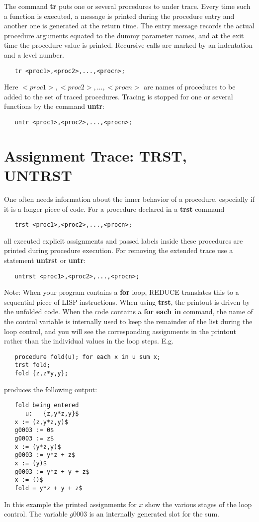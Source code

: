 The command {\bf tr} puts one or several procedures to
under trace. Every time such a function is executed, a message
is printed during the procedure entry and another one is generated
at the return time. The entry message records the 
actual procedure arguments equated to the dummy parameter
names, and at the exit time the procedure value is printed.
Recursive calls are marked by an indentation and a level number.

\begin{verbatim}
   tr <proc1>,<proc2>,...,<procn>;
\end{verbatim}
Here $<proc1>,<proc2>, \ldots ,<procn>$ are names of procedures
to be added to the set of traced procedures. Tracing is
stopped for one or several functions by the
command {\bf untr}:
\begin{verbatim}
   untr <proc1>,<proc2>,...,<procn>;
\end{verbatim}

\section{Assignment Trace: TRST, UNTRST}

One often needs information about the inner behavior of
a procedure, especially if it is a longer piece of code.
For a procedure declared in a {\bf trst} command 
\begin{verbatim}
   trst <proc1>,<proc2>,...,<procn>;
\end{verbatim}
all executed explicit assignments and passed labels inside these
procedures are printed
during procedure execution. For removing the extended
trace use a statement {\bf untrst} or {\bf untr}:
\begin{verbatim}
   untrst <proc1>,<proc2>,...,<procn>;
\end{verbatim}

Note: When your program contains a {\bf for} loop, 
{\small REDUCE} translates this to a sequential piece of
LISP instructions. When using {\bf trst}, the printout
is driven by the unfolded code. When the code contains a
{\bf for each in} command, the name of the control variable is
internally used to keep the remainder of the list during the loop
control, and you will see the corresponding assignments
in the printout rather than the individual values in the
loop steps. E.g.
\begin{verbatim}
   procedure fold(u); for each x in u sum x;
   trst fold;
   fold {z,z*y,y};
\end{verbatim}
produces the following output:
\begin{verbatim}
   fold being entered
      u:   {z,y*z,y}$
   x := (z,y*z,y)$
   g0003 := 0$
   g0003 := z$
   x := (y*z,y)$
   g0003 := y*z + z$
   x := (y)$
   g0003 := y*z + y + z$
   x := ()$
   fold = y*z + y + z$
\end{verbatim}
In this example the printed assignments for $x$ show the
various stages of the loop control. The variable $g0003$ is
an internally generated slot for the sum.


